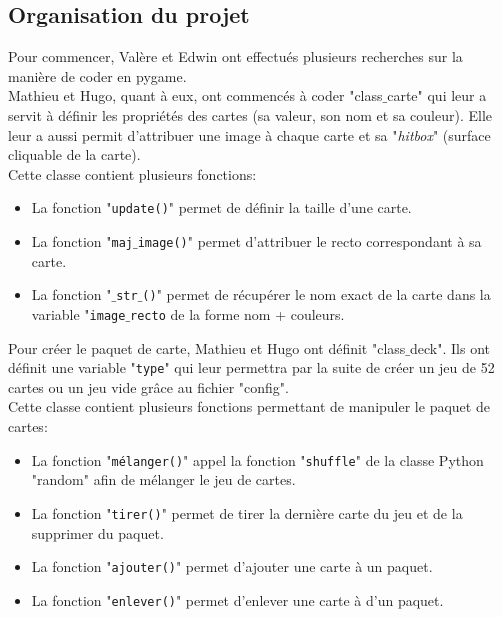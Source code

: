 \documentclass[french,12pt]{article}
\begin{document}
\subsection{Organisation du projet}

Pour commencer, Valère et Edwin ont effectués plusieurs recherches sur la manière de coder en pygame. \\
Mathieu et Hugo, quant à eux, ont commencés à coder "\textsf{class$\_$carte}" qui leur a servit à définir les propriétés des cartes (sa valeur, son nom et sa couleur). Elle leur a aussi permit d'attribuer une image à chaque carte et sa "\textit{hitbox}" (surface cliquable de la carte).\\
Cette classe contient plusieurs fonctions:\\
\begin{itemize}
\item La fonction "\texttt{update()}" permet de définir la taille d'une carte.
\item La fonction "\texttt{maj$\_$image()}" permet d'attribuer le recto correspondant à sa carte.
\item La fonction "\texttt{$\_$str$\_$()}" permet de récupérer le nom exact de la carte dans la variable "\texttt{image$\_$recto} de la forme nom + couleurs.\\
\end{itemize}

Pour créer le paquet de carte, Mathieu et Hugo ont définit "\textsf{class$\_$deck}". Ils ont définit une variable "\texttt{type}" qui leur permettra par la suite de créer un jeu de 52 cartes ou un jeu vide grâce au fichier "\textsf{config}".\\
Cette classe contient plusieurs fonctions permettant de manipuler le paquet de cartes:\\
\begin{itemize}
\item La fonction "\texttt{mélanger()}" appel la fonction "\texttt{shuffle}" de la classe Python "\textsf{random}" afin de mélanger le jeu de cartes.
\item La fonction "\texttt{tirer()}" permet de tirer la dernière carte du jeu et de la supprimer du paquet.
\item La fonction "\texttt{ajouter()}" permet d'ajouter une carte à un paquet.
\item La fonction "\texttt{enlever()}" permet d'enlever une carte à d'un paquet.\\
\end{itemize}
\end{document}
